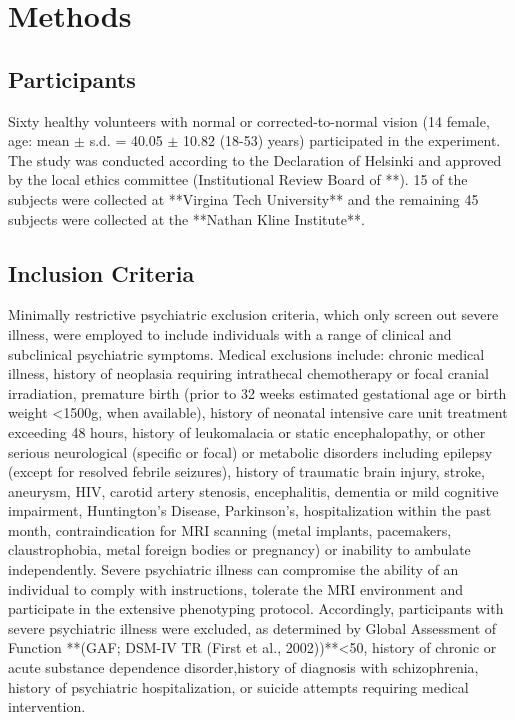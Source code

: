 \section{Methods}

\subsection{Participants}
Sixty healthy volunteers with normal or corrected-to-normal vision (14 female, age: mean $\pm$ s.d. = 40.05 $\pm$ 10.82 (18-53) years) participated in the experiment. The study was conducted according to the Declaration of Helsinki and approved by the local ethics committee (Institutional Review Board of **). 15 of the subjects were collected at **Virgina Tech University** and the remaining 45 subjects were collected at the **Nathan Kline Institute**.

\subsection{Inclusion Criteria}
Minimally restrictive psychiatric exclusion criteria, which only screen out severe illness, were employed to include individuals with a range of clinical and subclinical psychiatric symptoms. Medical exclusions include: chronic medical illness, history of neoplasia requiring intrathecal chemotherapy or focal cranial irradiation, premature birth (prior to 32 weeks estimated gestational age or birth weight \textless 1500g, when available), history of neonatal intensive care unit treatment exceeding 48 hours, history of leukomalacia or static encephalopathy, or other serious neurological (specific or focal) or metabolic disorders including epilepsy (except for resolved febrile seizures), history of traumatic brain injury, stroke, aneurysm, HIV, carotid artery stenosis, encephalitis, dementia or mild cognitive impairment, Huntington's Disease, Parkinson's, hospitalization within the past month, contraindication for MRI scanning (metal implants, pacemakers, claustrophobia, metal foreign bodies or pregnancy) or inability to ambulate independently. Severe psychiatric illness can compromise the ability of an individual to comply with instructions, tolerate the MRI environment and participate in the extensive phenotyping protocol. Accordingly, participants with severe psychiatric illness were excluded, as determined by Global Assessment of Function **(GAF; DSM-IV TR (First et al., 2002))**\textless 50, history of chronic or acute substance dependence disorder,history of diagnosis with schizophrenia, history of psychiatric hospitalization, or suicide attempts requiring medical intervention.

